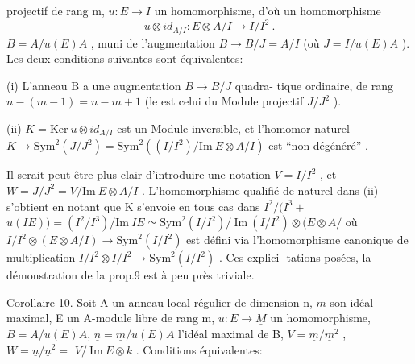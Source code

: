 
projectif de rang m,  $u{:}E \to I$ un homomorphisme, d'où un homomorphisme
\[ u\otimes id_{A/I} : E\otimes A/I \longrightarrow I/I^2 \ . \]
  $B = A/u(E)A$ , muni de l'augmentation $B\to B/J = A/I$
(où $J = I/u(E)A$ ). Les deux conditions suivantes sont équivalentes:

\margin{$\|$} (i) L'anneau  B  a une augmentation $B\to B/J$  quadra-%
tique ordinaire, de rang $n-(m-1)= n-m+1$ (le 
est  celui du Module projectif $J/J^2$ ).

\margin{$|$} (ii) $K = \mathrm{Ker}\ u\otimes id_{A/I}$ est un Module inversible, et l'homomor
 naturel $K \longrightarrow \mathrm{Sym}^2(J/J^2) = \mathrm{Sym}^2( (I/I^2)/\mathrm{Im}\ E\otimes A/I )$ est
``non dégénéré'' .

Il serait peut-être plus clair d'introduire une notation $V = I/I^2$ ,
et $W = J/J^2 = V / \mathrm{Im}\ E\otimes A/I$ . L'homomorphisme qualifié de naturel
dans (ii) s'obtient en notant que K s'envoie en tous cas dans
\margin{$|$} $I^2/(I^3 +$  $u(IE)) = (I^2/I^3)/\mathrm{Im}\ IE \simeq \mathrm{Sym}^2(I/I^2)/\ \mathrm{Im}\ (I/I^2)\otimes(E\otimes A/$
où $I/I^2 \otimes(E \otimes A/I) \to \mathrm{Sym}^2(I/I^2)$ est défini via l'homomorphisme
canonique de multiplication $I/I^2 \otimes I/I^2 \to \mathrm{Sym}^2(I/I^2 )$ . Ces explici-%
tations posées, la démonstration de la prop.9 est à peu près triviale.

\uline{Corollaire} 10. Soit A un anneau local régulier de dimension n, $\underline{m}$ son
idéal maximal,  E un A-module libre de rang m, $u{:}E \to \underline{M}$ un homomorphisme,
 $B = A/u(E)A$, $\underline{n} = \underline{m}/u(E)A$ l'idéal maximal de B,
$V = \underline{m}/\underline{m}^2$ , $W = \underline{n}/\underline{n}^2 =$  $V/\ \mathrm{Im}\ E\otimes k$ . Conditions équivalentes:

